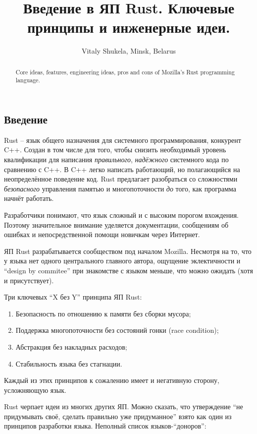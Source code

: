 \documentclass[10pt, a5paper]{article}
\begin{document}
\title{Введение в ЯП Rust. Ключевые принципы и инженерные идеи.}
\author{Vitaly Shukela, Minsk, Belarus}
\maketitle
\begin{abstract}
Core ideas, features, engineering ideas, pros and cons of Mozilla's Rust programming language.
\end{abstract}
\subsection*{Введение}

Rust -- язык общего назначения для системного программирования, конкурент C++. Создан в том числе для того, чтобы снизить необходимый уровень квалификации для написания \emph{правильного}, \emph{надёжного} системного кода по сравнению с C++. В C++ легко написать работающий, но полагающийся на неопределённое поведение код. Rust предлагает разобраться со сложностями \emph{безопасного} управления памятью и
многопоточности \emph{до} того, как программа начнёт работать.

Разработчики понимают, что язык сложный и с высоким порогом вхождения. Поэтому значительное внимание уделяется документации, сообщениям об ошибках и непосредственной помощи новичкам через Интернет.

ЯП Rust разрабатывается сообществом под началом Mozilla. Несмотря на то, что у языка нет одного центрального главного автора, ощущение эклектичности и ``design by commitee'' при знакомстве с языком меньше, что можно ожидать (хотя и присутствует).

Три ключевых ``X без Y'' принципа ЯП Rust:

\begin{enumerate}
  \item Безопасность по отношению к памяти без сборки мусора;
  \item Поддержка многопоточности без состояний гонки (race condition);
  \item Абстракция без накладных расходов;
  \item Стабильность языка без стагнации.
\end{enumerate}

Каждый из этих принципов к сожалению имеет и негативную сторону, усложняющую язык.

Rust черпает идеи из многих других ЯП. Можно сказать, что утверждение ``не придумывать своё, сделать правильно уже придуманное'' взято как один из принципов разработки языка. Неполный список языков-``доноров'':
\end{document}
